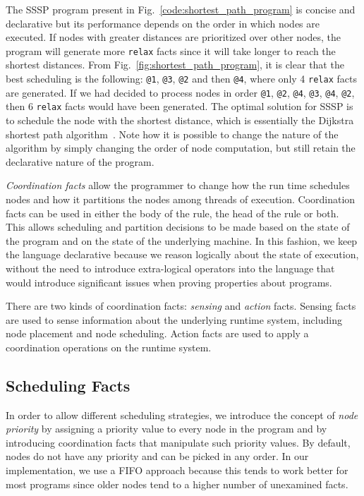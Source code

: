The SSSP program present in Fig.~\ref{code:shortest_path_program} is concise and
declarative but its performance depends on the order in which nodes are
executed. If nodes with greater distances are prioritized over other nodes, the
program will generate more \texttt{relax} facts since it will take longer to
reach the shortest distances. From Fig.~\ref{fig:shortest_path_program}, it is
clear that the best scheduling is the following: \texttt{@1},
\texttt{@3}, \texttt{@2} and then \texttt{@4}, where only 4 \texttt{relax}
facts are generated. If we had decided to process nodes in order
\texttt{@1}, \texttt{@2}, \texttt{@4}, \texttt{@3}, \texttt{@4},
\texttt{@2}, then 6 \texttt{relax} facts would have been generated.
The optimal solution for SSSP is to schedule the node with the
shortest distance, which is essentially the Dijkstra shortest path
algorithm~\cite{Dijkstra}. Note how it is possible to change the nature of
the algorithm by simply changing the order of node computation, but still
retain the declarative nature of the program.

\emph{Coordination facts} allow the programmer
to change how the run time schedules nodes and how it partitions the nodes among
threads of execution. Coordination facts can be used in either the body of the
rule, the head of the rule or both.
This allows scheduling and partition decisions to be made based on the state of
the program and on the state of the underlying machine.
In this fashion, we keep the language declarative because we reason logically
about the state of execution, without the need to introduce extra-logical
operators into the language that would introduce significant issues when proving
properties about programs.

There are two kinds of coordination facts: \emph{sensing} and \emph{action}
facts. Sensing facts are used to sense information about the
underlying runtime system, including node placement and node scheduling.
Action facts are used to apply a coordination operations on the runtime system.

\subsection{Scheduling Facts}\label{sec:fifo}

In order to allow different scheduling strategies, we introduce the concept of
\emph{node priority} by assigning a priority value to every node in the program
and by introducing coordination facts that manipulate such priority values.
By default, nodes do not have any priority and can be picked in any order. In
our implementation, we use a FIFO approach because this tends to work better for
most programs since older nodes tend to a higher number of unexamined facts.

